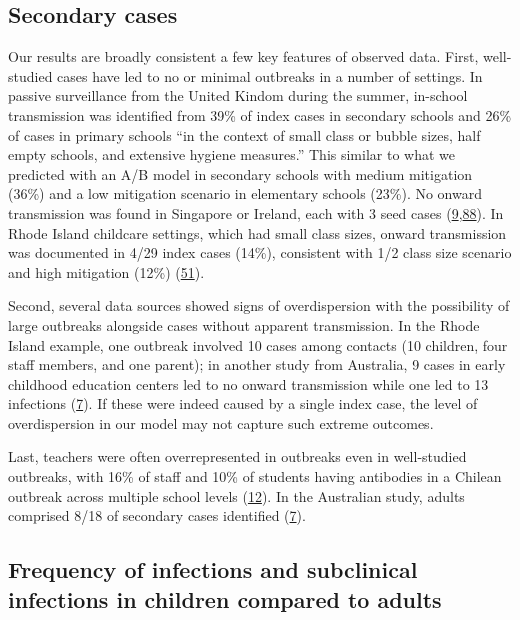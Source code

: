 \documentclass[
]{article}
\begin{document}
\hypertarget{secondary-cases}{%
\subsection{Secondary cases}\label{secondary-cases}}

Our results are broadly consistent a few key features of observed data.
First, well-studied cases have led to no or minimal outbreaks in a
number of settings. In passive surveillance from the United Kindom
during the summer, in-school transmission was identified from 39\% of
index cases in secondary schools and 26\% of cases in primary schools
``in the context of small class or bubble sizes, half empty schools, and
extensive hygiene measures.'' This similar to what we predicted with an
A/B model in secondary schools with medium mitigation (36\%) and a low
mitigation scenario in elementary schools (23\%). No onward transmission
was found in Singapore or Ireland, each with 3 seed cases
(\protect\hyperlink{ref-yung_novel_nodate}{9},\protect\hyperlink{ref-heavey_no_2020}{88}).
In Rhode Island childcare settings, which had small class sizes, onward
transmission was documented in 4/29 index cases (14\%), consistent with
1/2 class size scenario and high mitigation (12\%)
(\protect\hyperlink{ref-link-gelles_limited_2020}{51}).

Second, several data sources showed signs of overdispersion with the
possibility of large outbreaks alongside cases without apparent
transmission. In the Rhode Island example, one outbreak involved 10
cases among contacts (10 children, four staff members, and one parent);
in another study from Australia, 9 cases in early childhood education
centers led to no onward transmission while one led to 13 infections
(\protect\hyperlink{ref-macartney_transmission_2020}{7}). If these were
indeed caused by a single index case, the level of overdispersion in our
model may not capture such extreme outcomes.

Last, teachers were often overrepresented in outbreaks even in
well-studied outbreaks, with 16\% of staff and 10\% of students having
antibodies in a Chilean outbreak across multiple school levels
(\protect\hyperlink{ref-torres_sars-cov-2_nodate}{12}). In the
Australian study, adults comprised 8/18 of secondary cases identified
(\protect\hyperlink{ref-macartney_transmission_2020}{7}).

\hypertarget{frequency-of-infections-and-subclinical-infections-in-children-compared-to-adults}{%
\subsection{Frequency of infections and subclinical infections in
children compared to
adults}\label{frequency-of-infections-and-subclinical-infections-in-children-compared-to-adults}}
\end{document}
